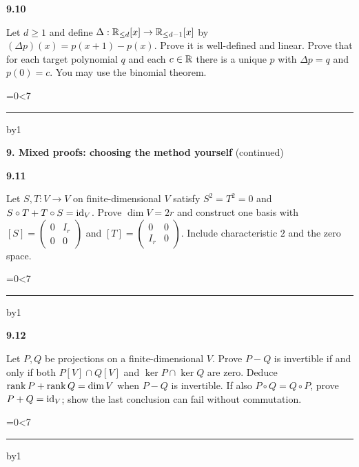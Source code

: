 \documentclass[11pt,letterpaper]{article}
\newcommand{\topicshort}{Problem collection}
\newcommand{\ruled}[1]{\par\begingroup\parskip=0pt\baselineskip=17pt\count255=0\loop\ifnum\count255<#1\noindent\textcolor{black!17}{\rule{\linewidth}{.25pt}}\par\advance\count255 by1\repeat\endgroup}
\newcommand{\problem}[4]{\noindent\begin{minipage}[t][3.48in][t]{\linewidth}\textbf{\color{navy}#1}\quad{\small\sffamily\color{teal}#2#3}\par #4\par\vfill\ruled{7}\end{minipage}}
\begin{document}
\par\vspace{14pt}
\problem{9.10}{M}{}{Let $d\ge1$ and define $\Delta:\mathbb R_{\le d}[x]\to\mathbb R_{\le d-1}[x]$ by $(\Delta p)(x)=p(x+1)-p(x)$. Prove it is well-defined and linear. Prove that for each target polynomial $q$ and each $c\in\mathbb R$ there is a unique $p$ with $\Delta p=q$ and $p(0)=c$. You may use the binomial theorem.}
\newpage
\renewcommand{\topicshort}{Mixed proofs}
{\large\bfseries\color{navy}9. Mixed proofs: choosing the method yourself} {\small(continued)}\par\vspace{9pt}
\problem{9.11}{C}{}{Let $S,T:V\to V$ on finite-dimensional $V$ satisfy $S^2=T^2=0$ and $S\circ T+T\circ S=\operatorname{id}_V$. Prove $\dim V=2r$ and construct one basis with $[S]=\begin{pmatrix}0&I_r\\0&0\end{pmatrix}$ and $[T]=\begin{pmatrix}0&0\\I_r&0\end{pmatrix}$. Include characteristic $2$ and the zero space.}
\par\vspace{14pt}
\problem{9.12}{C}{}{Let $P,Q$ be projections on a finite-dimensional $V$. Prove $P-Q$ is invertible if and only if both $P[V]\cap Q[V]$ and $\ker P\cap\ker Q$ are zero. Deduce $\operatorname{rank} P+\operatorname{rank} Q=\dim V$ when $P-Q$ is invertible. If also $P\circ Q=Q\circ P$, prove $P+Q=\operatorname{id}_V$; show the last conclusion can fail without commutation.}
\end{document}
